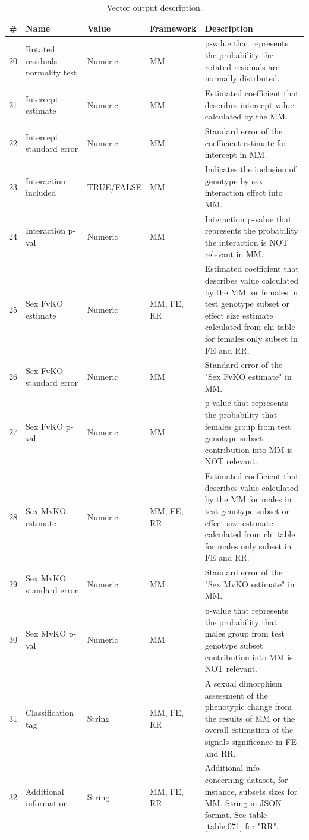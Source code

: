 \documentclass[12pt,a4paper]{article}
\begin{document}
\begin{table}
\begin{tabular}{| l | l | l | l | p{10cm} |}
  \hline
\#&Name&Value&Framework&Description\\\hline
20&Rotated residuals normality test&Numeric&MM&p-value that represents the probability the rotated residuals are normally distrbuted.\\
21&Intercept estimate&Numeric&MM&Estimated coefficient that describes intercept value calculated by the MM.\\
22&Intercept standard error&Numeric&MM&Standard error of the coefficient estimate for intercept in MM.\\
23&Interaction included&TRUE/FALSE&MM&Indicates the inclusion of genotype by sex interaction effect into MM.\\
24&Interaction p-val&Numeric&MM&Interaction p-value that represents the probability the interaction is NOT relevant in MM.\\
25&Sex FvKO estimate&Numeric&MM, FE, RR&Estimated coefficient that describes value calculated by the MM for females in test genotype subset or effect size estimate calculated from chi table for females only subset in FE and RR.\\
26&Sex FvKO standard error&Numeric&MM&Standard error of the "Sex FvKO estimate" in MM.\\
27&Sex FvKO p-val&Numeric&MM&p-value that represents the probability that females group from test genotype subset contribution into MM is NOT relevant.\\
28&Sex MvKO estimate&Numeric&MM, FE, RR&Estimated coefficient that describes value calculated by the MM for males in test genotype subset or effect size estimate calculated from chi table for males only subset in FE and RR.\\
29&Sex MvKO standard error&Numeric&MM&Standard error of the "Sex MvKO estimate" in MM.\\
30&Sex MvKO p-val&Numeric&MM&p-value that represents the probability that males group from test genotype subset contribution into MM is NOT relevant.\\
31&Classification tag&String&MM, FE, RR&A sexual dimorphism assessment of the phenotypic change from the results of MM or the overall estimation of the signals significance in FE and RR.\\
32&Additional information&String&MM, FE, RR&Additional info concerning dataset, for instance, subsets sizes for MM. String in JSON format. See table \ref{table:071} for "RR".\\
\hline  
\end{tabular}
\caption{Vector output description.}\label{table:07}
\end{table}
\end{document}
